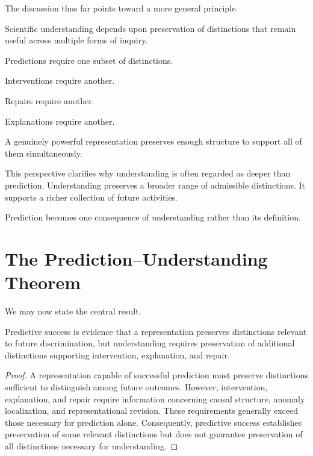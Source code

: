 \documentclass[11pt,oneside,openany]{book}
\begin{document}
The discussion thus far points toward a more general principle.

Scientific understanding depends upon preservation of distinctions that remain useful across multiple forms of inquiry.

Predictions require one subset of distinctions.

Interventions require another.

Repairs require another.

Explanations require another.

A genuinely powerful representation preserves enough structure to support all of them simultaneously.

This perspective clarifies why understanding is often regarded as deeper than prediction. Understanding preserves a broader range of admissible distinctions. It supports a richer collection of future activities.

Prediction becomes one consequence of understanding rather than its definition.

\section{The Prediction–Understanding Theorem}

We may now state the central result.

\begin{theorem}

Predictive success is evidence that a representation preserves distinctions relevant to future discrimination, but understanding requires preservation of additional distinctions supporting intervention, explanation, and repair.

\end{theorem}

\begin{proof}

A representation capable of successful prediction must preserve distinctions sufficient to distinguish among future outcomes. However, intervention, explanation, and repair require information concerning causal structure, anomaly localization, and representational revision. These requirements generally exceed those necessary for prediction alone. Consequently, predictive success establishes preservation of some relevant distinctions but does not guarantee preservation of all distinctions necessary for understanding.

\end{proof}
\end{document}
